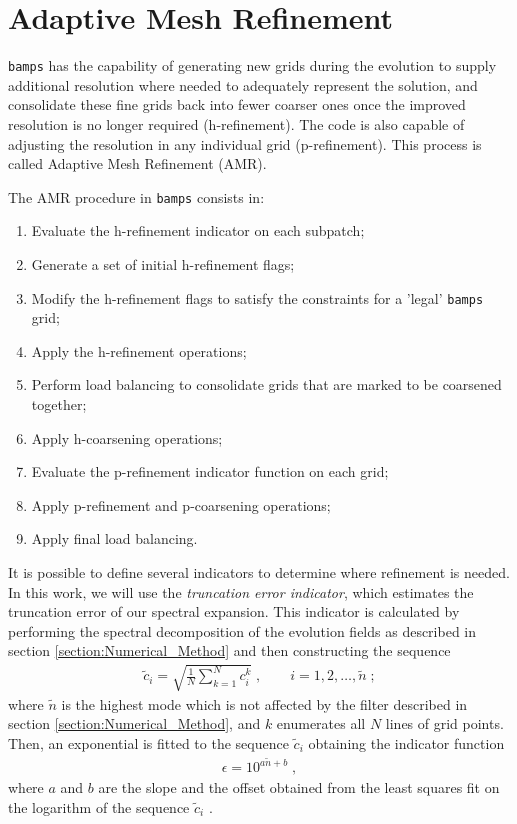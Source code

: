 \section{Adaptive Mesh Refinement}
\label{section:amr}

\texttt{bamps} has the capability of generating new grids during the evolution to supply additional resolution where needed to adequately represent the solution, and consolidate these fine grids back into fewer coarser ones once the improved resolution is no longer required (h-refinement). The code is also capable of adjusting the resolution in any individual grid (p-refinement). This process is called Adaptive Mesh Refinement (AMR).

The AMR procedure in \texttt{bamps} consists in:
%
\begin{enumerate}
    \item Evaluate the h-refinement indicator on each subpatch;
    \item Generate a set of initial h-refinement flags;
    \item Modify the h-refinement flags to satisfy the constraints for a 'legal' \texttt{bamps} grid; 
    \item Apply the h-refinement operations;
    \item Perform load balancing to consolidate grids that are marked to be coarsened together;
    \item Apply h-coarsening operations;
    \item Evaluate the p-refinement indicator function on each grid;
    \item Apply p-refinement and p-coarsening operations;
    \item Apply final load balancing.
\end{enumerate}

It is possible to define several indicators to determine where refinement is needed. In this work, we will use the \textit{truncation error indicator}, which estimates the truncation error of our spectral expansion. This indicator is calculated by performing the spectral decomposition of the evolution fields as described in section \ref{section:Numerical_Method} and then constructing the sequence
%
\begin{align}
    \tilde{c}_i = \sqrt{\frac{1}{N} \sum_{k=1}^N c_i^k} \; , \quad \quad i = 1, 2, \ldots, \tilde{n} \; ;
\end{align}
%
where $\tilde{n}$ is the highest mode which is not affected by the filter described in section \ref{section:Numerical_Method}, and $k$ enumerates all $N$ lines of grid points. Then, an exponential is fitted to the sequence $\tilde{c}_i$ obtaining the indicator function
%
\begin{align}
    \epsilon = 10^{a \tilde{n} + b} \; ,
\end{align}
%
where $a$ and $b$ are the slope and the offset obtained from the least squares fit on the logarithm of the sequence $\tilde{c}_i$ \cite{Adaptive_hp_refinement_for_spectral_elements_in_numerical_relativity}.

